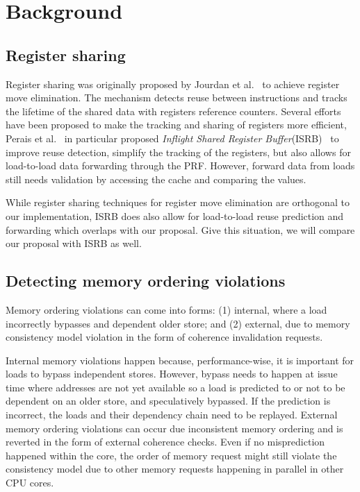 \documentclass{sig-alternate}
\begin{document}
\section{Background}

\subsection{Register sharing}
Register sharing was originally proposed by Jourdan et al.~\cite{} to achieve register move elimination. The mechanism detects reuse between instructions and tracks the lifetime of the shared data with registers reference counters. Several efforts have been proposed to make the tracking and sharing of registers more efficient, Perais et al.~\cite{} in particular proposed \textit{Inflight Shared Register Buffer}(ISRB)~\cite{} to improve reuse detection, simplify the tracking of the registers, but also allows for load-to-load data forwarding through the PRF. However, forward data from loads still needs validation by accessing the cache and comparing the values.

While register sharing techniques for register move elimination are orthogonal to our implementation, ISRB does also allow for load-to-load reuse prediction and forwarding which overlaps with our proposal. Give this situation, we will compare our proposal with ISRB as well.

\subsection{Detecting memory ordering violations}
Memory ordering violations can come into forms: (1) internal, where a load incorrectly bypasses and dependent older store; and (2) external, due to memory consistency model violation in the form of coherence invalidation requests.

Internal memory violations happen because, performance-wise, it is important for loads to bypass independent stores. However, bypass needs to happen at issue time where addresses are not yet available so a load is predicted to or not to be dependent on an older store, and speculatively bypassed. If the prediction is incorrect, the loads and their dependency chain need to be replayed. External memory ordering violations can occur due inconsistent  memory ordering and is reverted in the form of external coherence checks. Even if no misprediction happened within the core, the order of memory request might still violate the consistency model due to other memory requests happening in parallel in other CPU cores.
\end{document}

